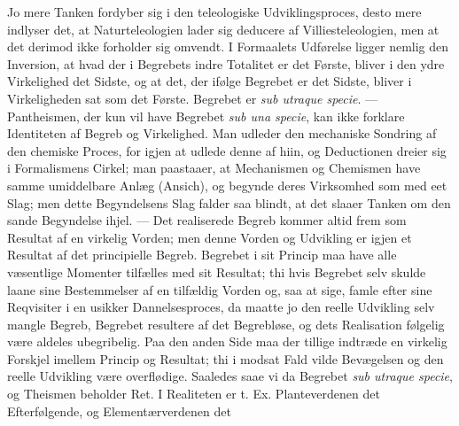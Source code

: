 \documentclass[12pt]{book}
\newcommand{\opage}[1]{\marginnote{\footnotesize\textit{[#1]}}}
\begin{document}
Jo mere Tanken fordyber sig i den teleologiske Udviklingsproces,
desto mere indlyser det, at Naturteleologien lader sig deducere af
Villiesteleologien, men at det derimod ikke forholder sig omvendt.
I Formaalets Udførelse ligger nemlig den Inversion, at hvad der i
Begrebets indre Totalitet er det Første, bliver i den ydre
Virkelighed det Sidste, og at det, der ifølge Begrebet er det
Sidste, bliver i Virkeligheden sat som det Første. Begrebet er
\textit{sub utraque specie}. --- Pantheismen, der kun vil have
Begrebet \textit{sub una specie}, kan ikke forklare Identiteten af
Begreb og Virkelighed. Man udleder den mechaniske Sondring af den
chemiske Proces, for igjen at udlede denne af hiin, og Deductionen
dreier sig i Formalismens Cirkel; man paastaaer, at Mechanismen og
Chemismen have samme umiddelbare Anlæg (Ansich), og begynde deres
Virksomhed som med eet Slag; men dette Begyndelsens Slag falder saa
blindt, at det slaaer Tanken om den sande Begyndelse ihjel. --- Det
realiserede Begreb kommer altid frem som Resultat af en virkelig
Vorden; men denne Vorden og Udvikling er igjen et Resultat af det
principielle Begreb. Begrebet i sit Princip maa have alle
væsentlige Momenter tilfælles med sit Resultat; thi hvis Begrebet
selv skulde laane sine Bestemmelser af en tilfældig Vorden og, saa
at sige, famle efter sine Reqvisiter i en usikker Dannelsesproces,
da maatte jo den reelle Udvikling selv mangle
\opage{231} Begreb, Begrebet resultere af det Begrebløse, og dets Realisation
følgelig være aldeles ubegribelig. Paa den anden Side maa der
tillige indtræde en virkelig Forskjel imellem Princip og Resultat;
thi i modsat Fald vilde Bevægelsen og den reelle Udvikling være
overflødige. Saaledes saae vi da Begrebet \textit{sub utraque
specie}, og Theismen beholder Ret. I Realiteten er t. Ex.
Planteverdenen det Efterfølgende, og Elementærverdenen det
\end{document}
